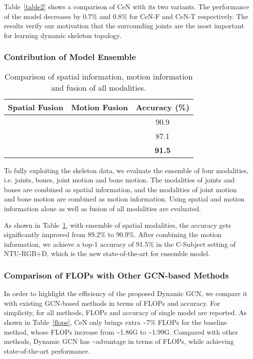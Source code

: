 \documentclass[sigconf]{acmart}
\begin{document}
Table~\ref{table2} shows a comparison of CeN with its two variants. The performance of the model decreases by 0.7\% and 0.8\% for CeN-F and CeN-T respectively. The results verify our motivation that the surrounding joints are the most important for learning dynamic skeleton topology.

\subsubsection{Contribution of Model Ensemble}




\begin{table}[t]
  \caption{Comparison of spatial information, motion information and fusion of all modalities.}
  \label{table3}
    \begin{tabular}{c|c|c}
    \toprule
    Spatial Fusion & {Motion Fusion} & Accuracy (\%)  \\
    \midrule
         &       & 90.9 \\
          &      & 87.1 \\
         &      & \textbf{91.5} \\
    \bottomrule
    \end{tabular}\end{table}

To fully exploiting the skeleton data, we evaluate the ensemble of four modalities, i.e. joints, bones, joint motion and bone motion. The modalities of joints and bones are combined as spatial information, and the modalities of joint motion and bone motion are combined as motion information. Using spatial and motion information alone as well as fusion of all modalities are evaluated.

As shown in Table~\ref{table3}, with ensemble of spatial modalities, the accuracy gets significantly improved from 89.2\% to 90.9\%. After combining the motion information, we achieve a top-1 accuracy of 91.5\% in the C-Subject setting of NTU-RGB+D, which is the new state-of-the-art for ensemble model.

\subsubsection{Comparison of FLOPs with Other GCN-based Methods}

In order to highlight the efficiency of the proposed Dynamic GCN, we compare it with existing GCN-based methods in terms of FLOPs and accuracy. For simplicity, for all methods, FLOPs and accuracy of single model are reported. As shown in Table~\ref{flops}, CeN only brings extra \textasciitilde7\% FLOPs for the baseline method, whose FLOPs increase from \textasciitilde1.86G to \textasciitilde1.99G. Compared with other methods, Dynamic GCN has \textasciitilde advantage in terms of FLOPs, while achieving state-of-the-art performance.
\end{document}
